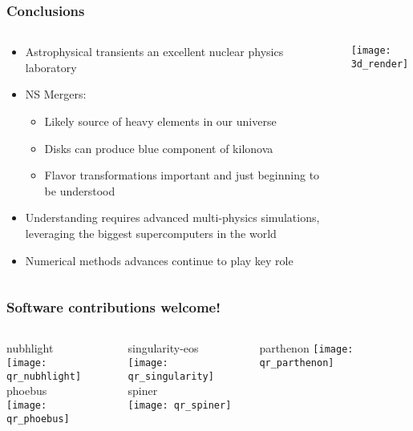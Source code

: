 \documentclass[]{beamer}
\begin{document}
\begin{frame}
  \frametitle{Conclusions}
  \begin{columns}
    \begin{column}{7cm}
      \begin{itemize}
      \item Astrophysical transients an excellent nuclear physics laboratory
      \item NS Mergers:
        \begin{itemize}
        \item Likely source of heavy elements in our
          universe
        \item Disks can produce blue component of kilonova
        \item Flavor transformations important and just beginning to be understood
        \end{itemize}
      \item Understanding requires advanced multi-physics simulations, leveraging the biggest supercomputers in the world
      \item Numerical methods advances continue to play key role
      \end{itemize}
    \end{column}
    \begin{column}{5cm}
      \texttt{[image: 3d\_render]}
    \end{column}
  \end{columns}
\end{frame}

\begin{frame}
  \frametitle{Software contributions welcome!}
  \begin{columns}
    \begin{column}{4cm}
      nubhlight\\
      \texttt{[image: qr\_nubhlight]}\\
      phoebus\\
      \texttt{[image: qr\_phoebus]}
    \end{column}
    \begin{column}{4cm}
      singularity-eos\\
      \texttt{[image: qr\_singularity]}\\
      spiner\\
      \texttt{[image: qr\_spiner]}\\
    \end{column}
    \begin{column}{4cm}
      parthenon
      \texttt{[image: qr\_parthenon]}
    \end{column}
  \end{columns}
\end{frame}
\end{document}
